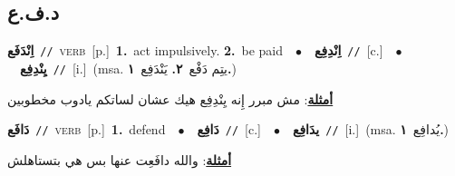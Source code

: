 \documentclass[10pt,a4paper,twoside]{article} %
\begin{document}
\begin{multicols}{2}
\vspace{-3mm}
\subsection*{\color{blue}\foreignlanguage{arabic}{د.ف.ع}\color{blue}{}} 

{\setlength\topsep{0pt}\textbf{\foreignlanguage{arabic}{اِنْدَفَع}}\ {\color{gray}\texttt{//}\color{black}}\ \textsc{verb}\ [p.]\ \textbf{1.}~act impulsively.  \textbf{2.}~be paid\ \ $\bullet$\ \ \setlength\topsep{0pt}\textbf{\foreignlanguage{arabic}{اِنْدِفِع}}\ {\color{gray}\texttt{//}\color{black}}\ [c.]\ \ $\bullet$\ \ \setlength\topsep{0pt}\textbf{\foreignlanguage{arabic}{يِنْدِفِع}}\ {\color{gray}\texttt{//}\color{black}}\ [i.]\ \color{gray}(msa. \foreignlanguage{arabic}{يتِم دَفْع}~\foreignlanguage{arabic}{\textbf{٢.}}  \foreignlanguage{arabic}{يَنْدَفِع}~\foreignlanguage{arabic}{\textbf{١.}})\color{black}\  \begin{flushright}\color{gray}\foreignlanguage{arabic}{\textbf{\underline{\foreignlanguage{arabic}{أمثلة}}}: مش مبرر إِنه يِنْدِفِع هيك عشان لساتكم يادوب مخطوبين}\end{flushright}\color{black}} \vspace{2mm}

{\setlength\topsep{0pt}\textbf{\foreignlanguage{arabic}{دَافَع}}\ {\color{gray}\texttt{//}\color{black}}\ \textsc{verb}\ [p.]\ \textbf{1.}~defend\ \ $\bullet$\ \ \setlength\topsep{0pt}\textbf{\foreignlanguage{arabic}{دَافِع}}\ {\color{gray}\texttt{//}\color{black}}\ [c.]\ \ $\bullet$\ \ \setlength\topsep{0pt}\textbf{\foreignlanguage{arabic}{يدَافِع}}\ {\color{gray}\texttt{//}\color{black}}\ [i.]\ \color{gray}(msa. \foreignlanguage{arabic}{يُدافِع}~\foreignlanguage{arabic}{\textbf{١.}})\color{black}\  \begin{flushright}\color{gray}\foreignlanguage{arabic}{\textbf{\underline{\foreignlanguage{arabic}{أمثلة}}}: والله دافَعِت عنها بس هي بتستاهلش}\end{flushright}\color{black}} \vspace{2mm}


\end{multicols}
\end{document}
